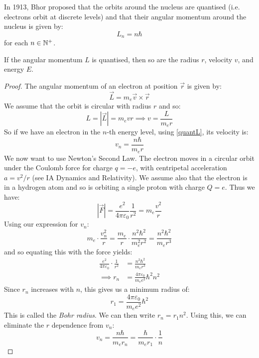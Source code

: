 \documentclass[../main.tex]{subfiles}
\begin{document}
In 1913, Bhor proposed that the orbits around the nucleus are quantised (i.e. electrons orbit at discrete levels) and that their angular momentum around the nucleus is given by:
\begin{equation}
  L_{n} = n \hbar \label{quantL}
\end{equation}
for each $n \in \mathbb{N}^{+}$.
\begin{proposition}
  If the angular momentum $L$ is quantised, then so are the radius $r$, velocity $v$, and energy $E$. \label{quantE}
\end{proposition}
\begin{proof}
  The angular momentum of an electron at position $\vec{r}$ is given by:
  \[
    \vec{L} = m_e \vec{v} \times \vec{r}
  \]
  We assume that the orbit is circular with radius $r$ and so:
  \[
    L = |\vec{L}| = m_e vr \implies v = \frac{L}{m_e r}
  \]
  So if we have an electron in the $n$-th energy level, using \cref{quantL}, its velocity is:
  \[
    v_{n} = \frac{n \hbar}{m_e r}
  \]
  We now want to use Newton's Second Law.
  The electron moves in a circular orbit under the Coulomb force for charge $q = -e$, with centripetal acceleration $a = v^2 / r$ (see IA Dynamics and Relativity).
  We assume also that the electron is in a hydrogen atom and so is orbiting a single proton with charge $Q = e$.
  Thus we have:
  \[
    |\vec{F}| = \frac{e^2}{4 \pi \varepsilon_0} \frac{1}{r^2} = m_e \frac{v^2}{r}
  \]
  Using our expression for $v_n$:
  \[
    m_e \cdot \frac{v^2_n}{r} = \frac{m_e}{r} \cdot \frac{n^2 \hbar^2}{m^2_e r^2} = \frac{n^2 \hbar^2}{m_e r^3}
  \]
  and so equating this with the force yields:
  \begin{align*}
    \frac{e^2}{4 \pi \varepsilon_0} \cdot \frac{1}{r^2} &= \frac{n^2 \hbar^2}{m_e r^3} \\
    \implies r_n &= \frac{4 \pi \varepsilon_0}{m_e e^2} \hbar^2 n^2
  \end{align*}
  Since $r_n$ increases with $n$, this gives us a minimum radius of:
  \[
    r_1 = \frac{4\pi \varepsilon_0}{m_e e^2} {\hbar}^2
  \]
  This is called the \textit{Bohr radius}.
  We can then write $r_n = r_1 n^2$.
  Using this, we can eliminate the $r$ dependence from $v_n$:
  \[
    v_n = \frac{n \hbar}{m_e r_n} = \frac{\hbar}{m_e r_1} \cdot \frac{1}{n}
  \]


\end{proof}
\end{document}
